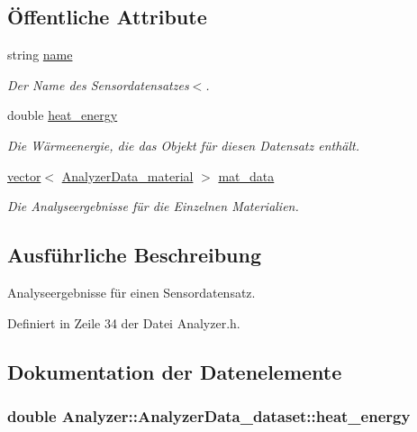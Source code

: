 \subsection*{Öffentliche Attribute}
\begin{DoxyCompactItemize}
\item 
string \hyperlink{structAnalyzer_1_1AnalyzerData__dataset_a53f3c1896123de4dc00f01e593d5f70d}{name}
\begin{DoxyCompactList}\small\item\em Der Name des Sensordatensatzes$<$. \end{DoxyCompactList}\item 
double \hyperlink{structAnalyzer_1_1AnalyzerData__dataset_aaefb798e2611790d5d956fe597bbafe0}{heat\-\_\-energy}
\begin{DoxyCompactList}\small\item\em Die Wärmeenergie, die das Objekt für diesen Datensatz enthält. \end{DoxyCompactList}\item 
\hyperlink{classstd_1_1vector}{vector}$<$ \hyperlink{structAnalyzer_1_1AnalyzerData__material}{Analyzer\-Data\-\_\-material} $>$ \hyperlink{structAnalyzer_1_1AnalyzerData__dataset_a25d0189c93bc0da58f778750edb2a2b9}{mat\-\_\-data}
\begin{DoxyCompactList}\small\item\em Die Analyseergebnisse für die Einzelnen Materialien. \end{DoxyCompactList}\end{DoxyCompactItemize}


\subsection{Ausführliche Beschreibung}
Analyseergebnisse für einen Sensordatensatz. 

Definiert in Zeile 34 der Datei Analyzer.\-h.



\subsection{Dokumentation der Datenelemente}
\hypertarget{structAnalyzer_1_1AnalyzerData__dataset_aaefb798e2611790d5d956fe597bbafe0}{
\subsubsection[{heat\-\_\-energy}]{\setlength{\rightskip}{0pt plus 5cm}double Analyzer\-::\-Analyzer\-Data\-\_\-dataset\-::heat\-\_\-energy}}\label{structAnalyzer_1_1AnalyzerData__dataset_aaefb798e2611790d5d956fe597bbafe0}


